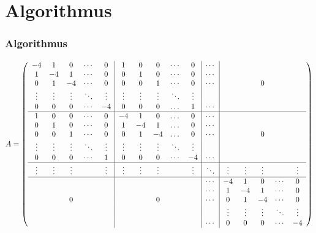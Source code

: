 

\section{Algorithmus}
\begin{frame}
\frametitle{Algorithmus}

\[
	A=\left(
	\begin{array}{ccccc|ccccc|c|ccccc}
	    -4&     1&     0&\cdots&     0 &     1&     0&     0&\cdots&     0 &\cdots &      &      &      &      &      \\
	     1&    -4&     1&\cdots&     0 &     0&     1&     0&\cdots&     0 &\cdots &      &      &      &      &      \\
	     0&     1&    -4&\cdots&     0 &     0&     0&     1&\cdots&     0 &\cdots &      &      &     0&      &      \\
	\vdots&\vdots&\vdots&\ddots&\vdots &\vdots&\vdots&\vdots&\ddots&\vdots &       &      &      &      &      &      \\
	     0&     0&     0&\cdots&    -4 &     0&     0&     0&\dots &     1 &\cdots &      &      &      &      &      \\
	\hline
	     1&     0&     0&\cdots&     0 &    -4&     1&     0&\dots &     0 &\cdots &      &      &      &      &      \\
	     0&     1&     0&\cdots&     0 &     1&    -4&     1&\dots &     0 &\cdots &      &      &      &      &      \\
	     0&     0&     1&\cdots&     0 &     0&     1&    -4&\dots &     0 &\cdots &      &      &     0&      &      \\
	\vdots&\vdots&\vdots&\ddots&\vdots &\vdots&\vdots&\vdots&\ddots&\vdots &       &      &      &      &      &      \\
	     0&     0&     0&\cdots&     1 &     0&     0&     0&\cdots&    -4 &\cdots &      &      &      &      &      \\
	\hline
	\vdots&\vdots&\vdots&      &\vdots &\vdots&\vdots&\vdots&      &\vdots &\ddots &\vdots&\vdots&\vdots&      &\vdots\\
	\hline
	      &      &      &      &       &      &      &      &      &       &\cdots &    -4&     1&     0&\cdots&     0\\
	      &      &      &      &       &      &      &      &      &       &\cdots &     1&    -4&     1&\cdots&     0\\
	      &      &     0&      &       &      &      &     0&      &       &\cdots &     0&     1&    -4&\cdots&     0\\
	      &      &      &      &       &      &      &      &      &       &       &\vdots&\vdots&\vdots&\ddots&\vdots\\
	      &      &      &      &       &      &      &      &      &       &\cdots &     0&     0&     0&\cdots&    -4\\
	\end{array}
	\right) 
	\]

\end{frame}